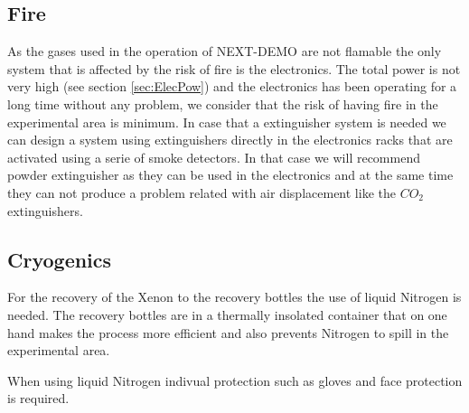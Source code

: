 \subsection{Fire}

As the gases used in the operation of NEXT-DEMO are not flamable the only system that is affected by the risk of fire is the electronics. The total power is not very high (see section \ref{sec:ElecPow}) and the electronics has been operating for a long time without any problem, we consider that the risk of having fire in the experimental area is minimum. In case that a extinguisher system is needed we can design a system using extinguishers directly in the electronics racks that are activated using a serie of smoke detectors. In that case we will recommend powder extinguisher as they can be used in the electronics and at the same time they can not produce a problem related with air displacement like the $CO_2$ extinguishers.


\subsection{Cryogenics}

For the recovery of the Xenon to the recovery bottles the use of liquid Nitrogen is needed. The recovery bottles are in a thermally insolated container that on one hand makes the process more efficient and also prevents Nitrogen to spill in the experimental area.

When using liquid Nitrogen indivual protection such as gloves and face protection is required. 



